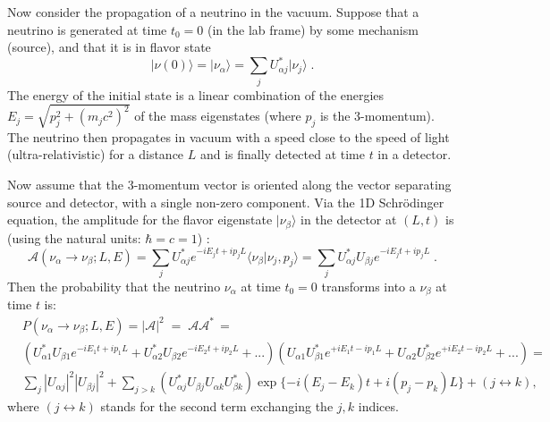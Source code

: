 Now consider the propagation of a neutrino in the vacuum. Suppose that a neutrino is generated at time $t_0=0$ (in the lab frame)  by some mechanism (source), and that it is in flavor state
\begin{equation}
|\nu(0) \rangle = |\nu_\alpha \rangle = \sum_j U^*_{\alpha j}|\nu_j \rangle \;.     
\end{equation}
The energy of the initial state is a linear combination of the energies $E_j=\sqrt{p_j^2 + (m_j c^2)^2}$ of the mass eigenstates (where $p_j$ is the 3-momentum). The neutrino then propagates in vacuum with a speed close to the speed of light (ultra-relativistic) for a distance $L$ and is finally detected at time $t$ in a detector.

Now assume that the 3-momentum vector is oriented along the vector separating source and detector, with a single non-zero component. Via the 1D  Schr\"{o}dinger equation, the amplitude for the flavor eigenstate $|\nu_\beta\rangle$ in the detector at $(L,t)$ is (using the natural units: $\hbar=c=1$) \cite{aitchison2012gauge}:
\begin{equation}
\mathcal{A}(\nu_\alpha\to\nu_\beta;L,E)=\sum_{j}U^*_{\alpha j}e^{-i E_j t+i p_j L}\langle\nu_\beta|\nu_j,p_j\rangle=\sum_{j}U^*_{\alpha j}U_{\beta j}e^{-iE_jt+ip_jL} \; .
\end{equation}
Then the probability that the neutrino $\nu_\alpha$ at time $t_0=0$ transforms into a $\nu_\beta$ at time $t$ is:
\begin{equation}\label{oscillationEq1}
 \begin{split}
&P(\nu_\alpha\to\nu_\beta;L,E)= |\mathcal{A}|^2 \; = \; \mathcal{A} \mathcal{A}^* \, =  \\%
&(U^*_{\alpha 1}U_{\beta 1}e^{-iE_1t+ip_1L}+U^*_{\alpha 2}U_{\beta 2}e^{-iE_2t+ip_2L}+...)(U_{\alpha 1}U^*_{\beta 1}e^{+iE_1t-ip_1L}+U_{\alpha 2}U^*_{\beta 2}e^{+iE_2t-ip_2L}+...)=\\
&\sum_j |U_{\alpha j}|^2|U_{\beta j}|^2 + \sum_{j>k}(U^*_{\alpha j}U_{\beta j}U_{\alpha k}U^*_{\beta k})\exp\{-i(E_j-E_k)t+i(p_j-p_k)L\}+(j\leftrightarrow k),
\end{split}
\end{equation}
where $(j\leftrightarrow k)$ stands for the second term exchanging the $j,k$ indices.

